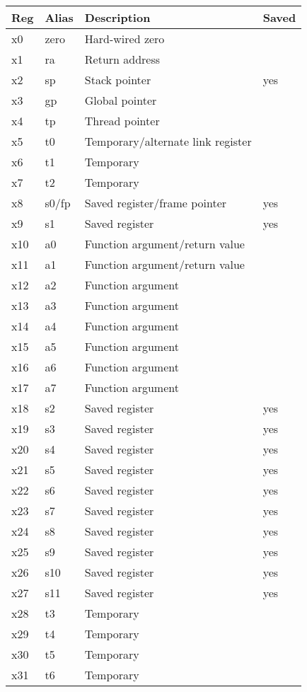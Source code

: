 \begin{center}
\begin{tabular}{|l|l|l|l|}
\hline
Reg	&	Alias	& Description						& Saved		\\
\hline
\hline
x0	&	zero	& Hard-wired zero					&			\\
x1	&	ra		& Return address					& 			\\
x2	&	sp		& Stack pointer						& yes		\\
x3	&	gp		& Global pointer					&			\\
x4	&	tp		& Thread pointer					&			\\
x5	&	t0		& Temporary/alternate link register	&			\\
x6	&	t1		& Temporary							&			\\
x7	&	t2		& Temporary							&			\\
x8	&	s0/fp	& Saved register/frame pointer		& yes		\\
x9	&	s1		& Saved register					& yes		\\
x10	&	a0		& Function argument/return value	& 			\\
x11	&	a1		& Function argument/return value	& 			\\
x12	&	a2		& Function argument					& 			\\
x13	&	a3		& Function argument					& 			\\
x14	&	a4		& Function argument					& 			\\
x15	&	a5		& Function argument					& 			\\
x16	&	a6		& Function argument					& 			\\
x17	&	a7		& Function argument					& 			\\
x18	&	s2		& Saved register					& yes		\\
x19	&	s3		& Saved register					& yes		\\
x20	&	s4		& Saved register					& yes		\\
x21	&	s5		& Saved register					& yes		\\
x22	&	s6		& Saved register					& yes		\\
x23	&	s7		& Saved register					& yes		\\
x24	&	s8		& Saved register					& yes		\\
x25	&	s9		& Saved register					& yes		\\
x26	&	s10		& Saved register					& yes		\\
x27	&	s11		& Saved register					& yes		\\
x28	&	t3		& Temporary							&			\\
x29	&	t4		& Temporary							&			\\
x30	&	t5		& Temporary							&			\\
x31	&	t6		& Temporary							&			\\
\hline
\end{tabular}
\end{center}



